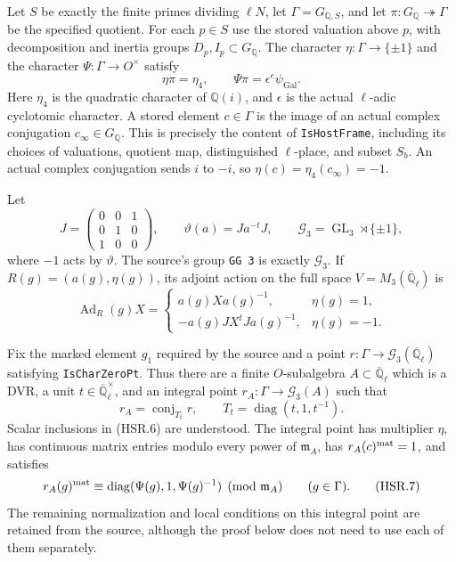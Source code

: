 Let $S$ be exactly the finite primes dividing $\ell N$, let
$\Gamma=G_{\mathbb Q,S}$, and let
$\pi:G_{\mathbb Q}\twoheadrightarrow\Gamma$ be the specified
quotient.  For each $p\in S$ use the stored valuation above $p$,
with decomposition and inertia groups $D_p,I_p\subset G_{\mathbb Q}$.
The character $\eta:\Gamma\to\{\pm1\}$ and the character
$\Psi:\Gamma\to O^\times$ satisfy
\[
 \eta\pi=\eta_4,\qquad
 \Psi\pi=\epsilon^e\psi_{\mathrm{Gal}}.
 \tag{HSR.3}
\]
Here $\eta_4$ is the quadratic character of $\mathbb Q(i)$,
and $\epsilon$ is the actual $\ell$-adic cyclotomic character.
A stored element $c\in\Gamma$ is the image of an actual complex
conjugation $c_\infty\in G_{\mathbb Q}$.  This is precisely the
content of \texttt{IsHostFrame}, including its choices of valuations,
quotient map, distinguished $\ell$-place, and subset $S_b$.
An actual complex conjugation sends $i$ to $-i$, so
$\eta(c)=\eta_4(c_\infty)=-1$.

Let
\[
 J=\begin{pmatrix}0&0&1\\0&1&0\\1&0&0\end{pmatrix},\qquad
 \vartheta(a)=Ja^{-t}J,
 \qquad \mathcal G_3=\operatorname{GL}_3\rtimes\{\pm1\},
 \tag{HSR.4}
\]
where $-1$ acts by $\vartheta$.  The source's group
\texttt{GG 3} is exactly $\mathcal G_3$.  If
$R(g)=(a(g),\eta(g))$, its adjoint action on the full space
$V=M_3(\overline{\mathbb Q}_\ell)$ is
\[
 \operatorname{Ad}_R(g)X=
 \begin{cases}
 a(g)Xa(g)^{-1},&\eta(g)=1,\\
 -a(g)JX^tJa(g)^{-1},&\eta(g)=-1.
 \end{cases}
 \tag{HSR.5}
\]

Fix the marked element $g_1$ required by the source and a point
$r:\Gamma\to\mathcal G_3(\overline{\mathbb Q}_\ell)$ satisfying
\texttt{IsCharZeroPt}.  Thus there are a finite $O$-subalgebra
$A\subset\overline{\mathbb Q}_\ell$ which is a DVR, a unit
$t\in\overline{\mathbb Q}_\ell^\times$, and an integral point
$r_A:\Gamma\to\mathcal G_3(A)$ such that
\[
 r_A=\operatorname{conj}_{T_t}r,
 \qquad T_t=\operatorname{diag}(t,1,t^{-1}).
 \tag{HSR.6}
\]
Scalar inclusions in (HSR.6) are understood.  The integral point has
multiplier $\eta$, has continuous matrix entries modulo every power
of $\mathfrak m_A$, has $r_A(c)^{\rm mat}=1$, and satisfies
\[
 r_A(g)^{\rm mat}\equiv
 \operatorname{diag}(\Psi(g),1,\Psi(g)^{-1})\pmod{\mathfrak m_A}
 \qquad(g\in\Gamma).
 \tag{HSR.7}
\]
The remaining normalization and local conditions on this integral
point are retained from the source, although the proof below does
not need to use each of them separately.

